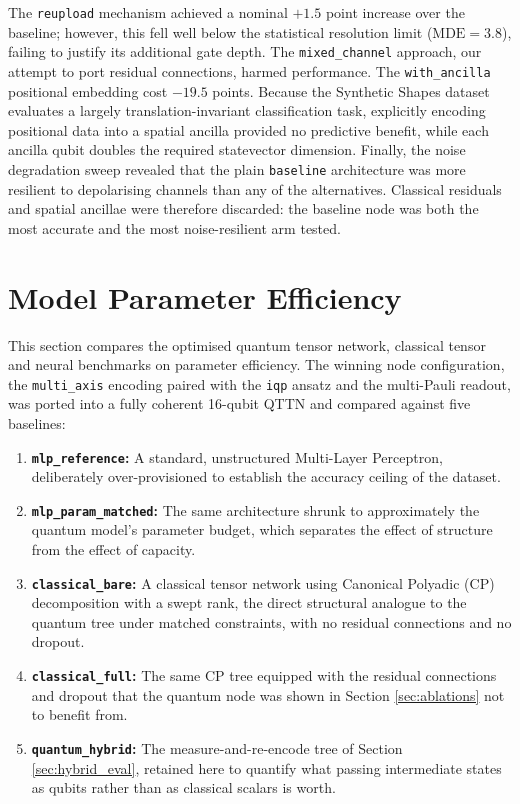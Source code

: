 \documentclass[12pt, a4paper, oneside]{report}
\begin{document}
The \texttt{reupload} mechanism achieved a nominal $+1.5$ point increase over the baseline; however, this fell well below the statistical resolution limit ($\text{MDE} = 3.8$), failing to justify its additional gate depth.
The \texttt{mixed\_channel} approach, our attempt to port residual connections, harmed performance. The \texttt{with\_ancilla} positional embedding cost $-19.5$ points. Because the Synthetic Shapes dataset evaluates a largely translation-invariant classification task, explicitly encoding positional data into a spatial ancilla provided no predictive benefit, while each ancilla qubit doubles the required statevector dimension.
Finally, the noise degradation sweep revealed that the plain \texttt{baseline} architecture was more resilient to depolarising channels than any of the alternatives. Classical residuals and spatial ancillae were therefore discarded: the baseline node was both the most accurate and the most noise-resilient arm tested.

\section{Model Parameter Efficiency}

This section compares the optimised quantum tensor network, classical tensor and neural benchmarks on parameter efficiency. The winning node configuration, the \texttt{multi\_axis} encoding paired with the \texttt{iqp} ansatz and the multi-Pauli readout, was ported into a fully coherent 16-qubit QTTN and compared against five baselines:

\begin{enumerate}
    \item \textbf{\texttt{mlp\_reference}:} A standard, unstructured Multi-Layer Perceptron, deliberately over-provisioned to establish the accuracy ceiling of the dataset.
    \item \textbf{\texttt{mlp\_param\_matched}:} The same architecture shrunk to approximately the quantum model's parameter budget, which separates the effect of structure from the effect of capacity.
    \item \textbf{\texttt{classical\_bare}:} A classical tensor network using Canonical Polyadic (CP) decomposition with a swept rank, the direct structural analogue to the quantum tree under matched constraints, with no residual connections and no dropout.
    \item \textbf{\texttt{classical\_full}:} The same CP tree equipped with the residual connections and dropout that the quantum node was shown in Section \ref{sec:ablations} not to benefit from.
    \item \textbf{\texttt{quantum\_hybrid}:} The measure-and-re-encode tree of Section \ref{sec:hybrid_eval}, retained here to quantify what passing intermediate states as qubits rather than as classical scalars is worth.
\end{enumerate}
\end{document}
